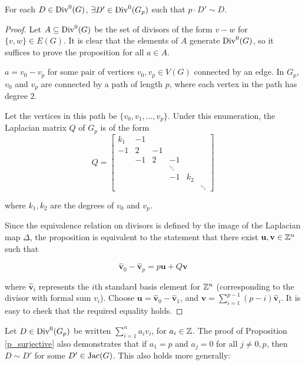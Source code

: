 \documentclass{amsart}
\newcommand{\bv}[1]{\widehat{\mathbf{#1}}}
\begin{document}
\begin{prop}
  \label{p_surjective}
  For each $D \in \operatorname{Div}^0(G)$, $\exists D' \in \operatorname{Div}^0(G_p)$ such that $p
  \cdot D' \sim D$.
\end{prop}
\begin{proof}
  Let $A \subseteq \operatorname{Div}^0(G)$ be the set of divisors of the form $v -
  w$ for $\{v, w\} \in E(G)$. It is clear that the elements of $A$
  generate $\operatorname{Div}^0(G)$, so it suffices to prove the proposition for
  all $a \in A$.
  
  $a = v_0 - v_p$ for some pair of vertices $v_0, v_p \in V(G)$
  connected by an edge. In $G_p$, $v_0$ and $v_p$ are connected by a
  path of length $p$, where each vertex in the path has degree $2$.

  Let the vertices in this path be $\{v_0, v_1, \ldots,
  v_p\}$. Under this enumeration, the Laplacian matrix $Q$ of $G_p$
  is of the form
  $$Q = \begin{bmatrix}
    k_1 & -1 \\
    -1 &  2 & -1 \\
    & -1 &  2 & -1 \\
    &    &    &  \ddots  \\
    &    &    &  -1 & k_2 \\ 
    &    &    &     &    & \ddots
  \end{bmatrix}$$

  where $k_1, k_2$ are the degrees of $v_0$ and $v_p$.
  
  Since the equivalence relation on divisors is defined by the image
  of the Laplacian map $\Delta$, the proposition is equivalent to the
  statement that there exist $\mathbf{u},\mathbf{v} \in \mathbb{Z}^n$ such
  that

  \begin{equation}
    \bv{v}_0 - \bv{v}_p  = p\mathbf{u} + Q\mathbf{v}
  \end{equation}

  where $\bv{v}_i$ represents the $i$th standard basis element for
  $\mathbb{Z}^n$ (corresponding to the divisor with formal sum $v_i$). Choose
  $\mathbf{u} = \bv{v}_0 - \bv{v}_1$, and $\mathbf{v} =
  \sum_{i=1}^{p-1}(p - i)\bv{v}_i$. It is easy to check that the
  required equality holds.
\end{proof}

Let $D \in \operatorname{Div}^0(G_p)$ be written $\sum_{i=1}^na_iv_i$, for $a_i \in
\mathbb{Z}$. The proof of Proposition \ref{p_surjective} also demonstrates
that if $a_1 = p$ and $a_j = 0$ for all $j \ne 0, p$, then $D \sim D'$
for some $D' \in \operatorname{Jac}(G)$. This also holds more generally:
\end{document}
